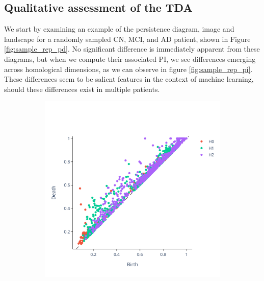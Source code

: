\documentclass{article}
\begin{document}
\subsection{Qualitative assessment of the TDA}

We start by examining an example of the persistence diagram, image and landscape for a randomly sampled CN, MCI, and AD patient, shown in Figure \ref{fig:sample_rep_pd}. No significant difference is immediately apparent from these diagrams, but when we compute their associated PI, we see differences emerging across homological dimensions, as we can observe in figure \ref{fig:sample_rep_pi}. These differences seem to be salient features in the context of machine learning, should these differences exist in multiple patients.

\begin{figure}
  \centering
  \begin{subfigure}{0.3\textwidth}
    \includegraphics[width=\textwidth]{figures/PDs/persistence_diagram_CN.png}
  \end{subfigure}
  \begin{subfigure}{0.3\textwidth}

\end{subfigure}
\end{figure}
\end{document}
